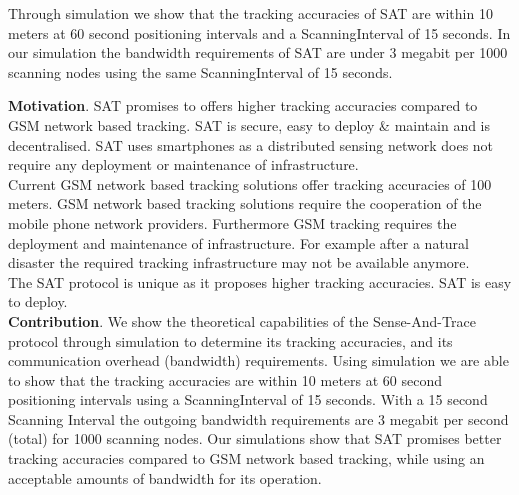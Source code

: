 \documentclass[10pt,titlepage]{article}
\begin{document}
Through simulation we show that the tracking accuracies of SAT are within 10 meters at 60 second positioning intervals and a ScanningInterval of 15 seconds. In our simulation the bandwidth requirements of SAT are under 3 megabit per 1000 scanning nodes using the same ScanningInterval of 15 seconds.\\

\textbf{Motivation}. SAT promises to offers higher tracking accuracies compared to GSM network based tracking. SAT is secure, easy to deploy \& maintain and is decentralised. SAT uses smartphones as a distributed sensing network does not require any deployment or maintenance of infrastructure.\\
Current GSM network based tracking solutions offer tracking accuracies of 100 meters. GSM network based tracking solutions require the cooperation of the mobile phone network providers. Furthermore GSM tracking requires the deployment and maintenance of infrastructure. For example after a natural disaster the required tracking infrastructure may not be available anymore.\\
The SAT protocol is unique as it proposes higher tracking accuracies. SAT is easy to deploy.\\








\textbf{Contribution}. We show the theoretical capabilities of the Sense-And-Trace protocol through simulation to determine its tracking accuracies, and its communication overhead (bandwidth) requirements. Using simulation we are able to show that the tracking accuracies are within 10 meters at 60 second positioning intervals using a ScanningInterval of 15 seconds. With a 15 second Scanning Interval the outgoing bandwidth requirements are 3 megabit per second (total) for 1000 scanning nodes. Our simulations show that SAT promises better tracking accuracies compared to GSM network based tracking, while using an acceptable amounts of bandwidth for its operation.\\
 
\end{document}
